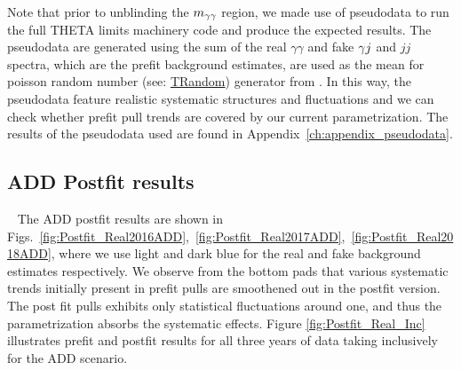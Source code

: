 Note that prior to unblinding the $m_{\gamma\gamma}$ region, we made use of pseudodata to run the full \textrm{THETA} limits machinery code and produce the expected results. The pseudodata are generated using the sum of the real $\gamma\gamma$ and fake $\gamma j$ and $jj$ spectra, which are the prefit background estimates, are used as the mean for poisson random number (see: \href{https://root.cern.ch/doc/master/classTRandom.html#a1529ed28e6ce1230d135548460b12c19}{TRandom}) generator from \ROOT. In this way, the pseudodata feature realistic systematic structures and fluctuations and we can check whether prefit pull trends are covered by our current parametrization. The results of the pseudodata used are found in Appendix~\ref{ch:appendix_pseudodata}.

\subsection{ADD Postfit results}~\label{sec:ADDPostfits}
 The ADD postfit results are shown in Figs.~\ref{fig:Postfit_Real2016ADD},~\ref{fig:Postfit_Real2017ADD},~\ref{fig:Postfit_Real2018ADD}, where we use light and dark blue for the real and fake background estimates respectively.
We observe from the bottom pads that various systematic trends initially present in prefit pulls are smoothened out in the postfit version. The post fit pulls exhibits only statistical fluctuations around one, and thus the \mgg parametrization absorbs the systematic effects. Figure \ref{fig:Postfit_Real_Inc} illustrates prefit and postfit results for all three years of data taking inclusively for the ADD scenario.

